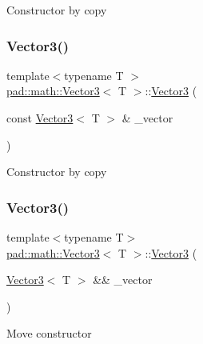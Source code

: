 Constructor by copy \mbox{\label{structpad_1_1math_1_1_vector3_a08af6d6eca643fe525839844c5790e6f}} 
\subsubsection{\texorpdfstring{Vector3()}{Vector3()}\hspace{0.1cm}{\footnotesize\ttfamily [4/5]}}
{\footnotesize\ttfamily template$<$typename T $>$ \\
\mbox{\hyperlink{structpad_1_1math_1_1_vector3}{pad\+::math\+::\+Vector3}}$<$ T $>$\+::\mbox{\hyperlink{structpad_1_1math_1_1_vector3}{Vector3}} (\begin{DoxyParamCaption}\item[{const \mbox{\hyperlink{structpad_1_1math_1_1_vector3}{Vector3}}$<$ T $>$ \&}]{\+\_\+vector }\end{DoxyParamCaption})}

Constructor by copy \mbox{\label{structpad_1_1math_1_1_vector3_adf7a624bdd20e8d79c6fe663c36ce43b}} 
\subsubsection{\texorpdfstring{Vector3()}{Vector3()}\hspace{0.1cm}{\footnotesize\ttfamily [5/5]}}
{\footnotesize\ttfamily template$<$typename T$>$ \\
\mbox{\hyperlink{structpad_1_1math_1_1_vector3}{pad\+::math\+::\+Vector3}}$<$ T $>$\+::\mbox{\hyperlink{structpad_1_1math_1_1_vector3}{Vector3}} (\begin{DoxyParamCaption}\item[{\mbox{\hyperlink{structpad_1_1math_1_1_vector3}{Vector3}}$<$ T $>$ \&\&}]{\+\_\+vector }\end{DoxyParamCaption})\hspace{0.3cm}{\ttfamily [default]}}

Move constructor \mbox{\label{structpad_1_1math_1_1_vector3_a8a778f1112409992f9e95a10f9760cfd}} 
